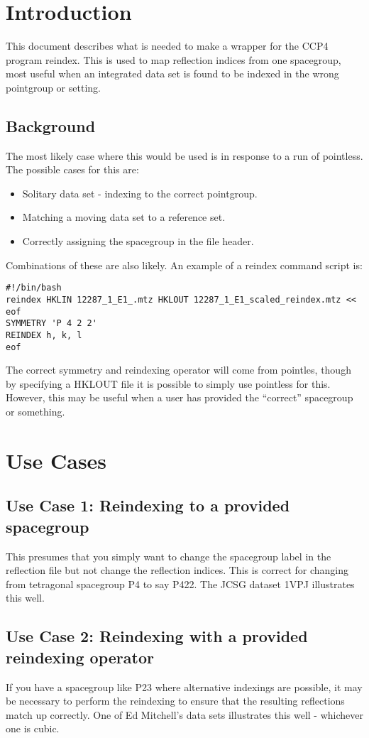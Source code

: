 \documentclass[a4paper, 11pt]{article}
\begin{document}
\section{Introduction}

This document describes what is needed to make a wrapper for the CCP4 
program reindex. This is used to map reflection indices from one spacegroup,
most useful when an integrated data set is found to be indexed in the wrong
pointgroup or setting.

\subsection{Background}

The most likely case where this would be used is in response to a run 
of pointless. The possible cases for this are:

\begin{itemize}
\item{Solitary data set - indexing to the correct pointgroup.}
\item{Matching a moving data set to a reference set.}
\item{Correctly assigning the spacegroup in the file header.}
\end{itemize}

Combinations of these are also likely. An example of a reindex command script
is:

{
\tiny
\begin{verbatim}
#!/bin/bash
reindex HKLIN 12287_1_E1_.mtz HKLOUT 12287_1_E1_scaled_reindex.mtz << eof
SYMMETRY 'P 4 2 2'
REINDEX h, k, l
eof
\end{verbatim}
}

The correct symmetry and reindexing operator will come from pointles, though
by specifying a HKLOUT file it is possible to simply use pointless for this.
However, this may be useful when a user has provided the ``correct'' spacegroup
or something.

\section{Use Cases}

\subsection{Use Case 1: Reindexing to a provided spacegroup}

This presumes that you simply want to change the spacegroup label in the 
reflection file but not change the reflection indices. This is correct for
changing from tetragonal spacegroup P4 to say P422. The JCSG dataset 1VPJ
illustrates this well.

\subsection{Use Case 2: Reindexing with a provided reindexing operator}

If you have a spacegroup like P23 where alternative indexings are possible,
it may be necessary to perform the reindexing to ensure that the resulting
reflections match up correctly. One of Ed Mitchell's data sets illustrates 
this well - whichever one is cubic.
\end{document}
